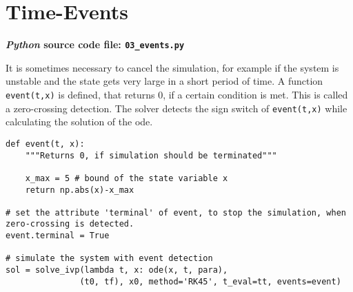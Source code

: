 \documentclass[a4paper,11pt,headinclude=true,headsepline,parskip=half,DIV=13]{scrartcl}
\newcommand{\py}{\emph{Python}\xspace}
\newcommand{\code}[1]{\lstinline[basicstyle=\normalsize\ttfamily]{#1}}
\begin{document}
\section{Time-Events}
\textbf{\py source code file: \texttt{03\_events.py}}

It is sometimes necessary to cancel the simulation, for example if the system is unstable and the state gets very large in a short period of time. A function \code{event(t,x)} is defined, that returns 0, if a certain condition is met. This is called a zero-crossing detection. The solver detects the sign switch of \code{event(t,x)} while calculating the solution of the \gls{ode}.
\begin{lstlisting}
def event(t, x):
	"""Returns 0, if simulation should be terminated"""
	
	x_max = 5 # bound of the state variable x
	return np.abs(x)-x_max
		
# set the attribute 'terminal' of event, to stop the simulation, when zero-crossing is detected.
event.terminal = True

# simulate the system with event detection
sol = solve_ivp(lambda t, x: ode(x, t, para), 
               (t0, tf), x0, method='RK45', t_eval=tt, events=event)
\end{lstlisting}
\printglossaries
\end{document}
